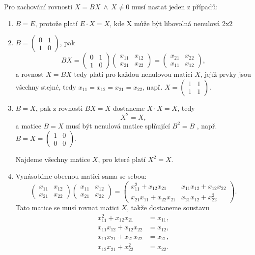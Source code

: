 \documentclass[12pt,a4paper]{article}
\begin{document}
Pro zachování rovnosti $X = BX \ \wedge\ X \neq 0$ musí nastat jeden z případů:
\begin{enumerate}
  \item[I.] $B = E$, protože platí $E\cdot X = X$, kde X může být libovolná nenulová 2x2
  \item[II.] $B = \begin{pmatrix} 0 & 1\\ 1 & 0\end{pmatrix}$, pak
  \[
  BX =
  \begin{pmatrix} 0 & 1\\ 1 & 0\end{pmatrix}
  \begin{pmatrix} x_{11} & x_{12}\\ x_{21} & x_{22}\end{pmatrix}
  =
  \begin{pmatrix} x_{21} & x_{22}\\ x_{11} & x_{12}\end{pmatrix},
  \]
  a rovnost $X = BX$ tedy platí pro každou nenulovou matici $X$, jejíž prvky jsou všechny stejné,
  tedy $x_{11} = x_{12} = x_{21} = x_{22}$, např. $X=\begin{pmatrix} 1 & 1\\ 1 & 1\end{pmatrix}$.
  \item[III.] $B = X$, pak z rovnosti $BX = X$ dostaneme $X\cdot X = X$, tedy
  \[
  X^{2} = X,
  \]
  a matice $B = X$ musí být nenulová matice splňující $B^{2} = B$ ,
  např. $B = X = \begin{pmatrix} 1 & 0\\ 0 & 0\end{pmatrix}$.

  Najdeme všechny matice $X$, pro které platí $X^{2}=X$.
  
  \item Vynásobíme obecnou matici sama se sebou:
  \[
  \begin{pmatrix} x_{11} & x_{12}\\ x_{21} & x_{22}\end{pmatrix}
  \begin{pmatrix} x_{11} & x_{12}\\ x_{21} & x_{22}\end{pmatrix}
  =
  \begin{pmatrix}
  x_{11}^{2}+x_{12}x_{21} & x_{11}x_{12}+x_{12}x_{22}\\
  x_{21}x_{11}+x_{22}x_{21} & x_{21}x_{12}+x_{22}^{2}
  \end{pmatrix}.
  \]
  Tato matice se musí rovnat matici $X$, takže dostaneme soustavu
  \begin{align*}
  x_{11}^{2}+x_{12}x_{21} &= x_{11},\\
  x_{11}x_{12}+x_{12}x_{22} &= x_{12},\\
  x_{11}x_{21}+x_{21}x_{22} &= x_{21},\\
  x_{12}x_{21}+x_{22}^{2} &= x_{22}.
  \end{align*}


\end{enumerate}
\end{document}
